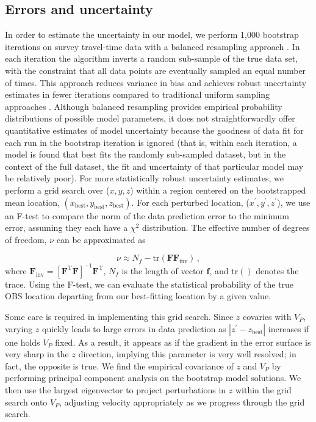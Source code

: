 \subsection{Errors and uncertainty}
In order to estimate the uncertainty in our model, we perform 1,000 bootstrap iterations on survey travel-time data with a balanced resampling approach \citep{Davison1986}. In each iteration the algorithm inverts a random sub-sample of the true data set, with the constraint that all data points are eventually sampled an equal number of times. This approach reduces variance in bias and achieves robust uncertainty estimates in fewer iterations compared to traditional uniform sampling approaches \citep{Hung2011}. Although balanced resampling provides empirical probability distributions of possible model parameters, it does not straightforwardly offer quantitative estimates of model uncertainty because the goodness of data fit for each run in the bootstrap iteration is ignored (that is, within each iteration, a model is found that best fits the randomly sub-sampled dataset, but in the context of the full dataset, the fit and uncertainty of that particular model may be relatively poor). For more statistically robust uncertainty estimates, we perform a grid search over ($x,y,z$) within a region centered on the bootstrapped mean location, 
$(x_{{\text{best}}},y_{{\text{best}}},z_{{\text{best}}})$. For each perturbed location, ($x^{\prime},y^{\prime},z^{\prime}$), we use an F-test to compare the norm of the data prediction error to the minimum error, assuming they each have a $\chi^2$ distribution. The effective number of degrees of freedom, $\nu$ can be approximated as 

\begin{equation}
\nu \approx N_f - \text{tr}(\mathbf{F}\mathbf{F}_{\text{inv}}) \,,
\end{equation}
where $\mathbf{F}_{\text{inv}}= \left[ \mathbf{F}^{\text{T}} \mathbf{F} \right]^{-1} \mathbf{F}^{\text{T}}$, $N_f$ is the length of vector $\mathbf{f}$, and $\text{tr}()$ denotes the trace. Using the F-test, we can evaluate the statistical probability of the true OBS location departing from our best-fitting location by a given value. 

Some care is required in implementing this grid search. Since $z$ covaries with $V_P$, varying $z$ quickly leads to large errors in data prediction as $|z^{\prime}-z_{{\text{best}}}|$ increases if one holds $V_P$ fixed. As a result, it appears as if the gradient in the error surface is very sharp in the $z$ direction, implying this parameter is very well resolved; in fact, the opposite is true. We find the empirical covariance of $z$ and $V_P$ by performing principal component analysis on the bootstrap model solutions. We then use the largest eigenvector to project perturbations in $z$ within the grid search onto $V_P$, adjusting velocity appropriately as we progress through the grid search. 

